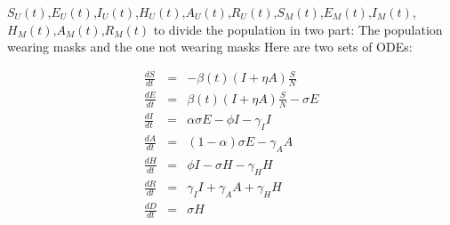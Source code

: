 \documentclass{article}
\begin{document}
$S_{U}(t)$,$E_{U}(t)$,$I_{U}(t)$,$H_{U}(t)$,$A_{U}(t)$,$R_{U}(t)$,$S_{M}(t)$,$E_{M}(t)$,$I_{M}(t)$,$H_{M}(t)$,$A_{M}(t)$,$R_{M}(t)$ to divide the population in two part: The population wearing masks and the one not wearing masks
Here are two sets of ODEs:\\
\begin{minipage}{0.45\textwidth}
\begin{eqnarray}
  \frac{dS}{dt} &=& -\beta{(t)}(I+\eta A)\frac{S}{N}\nonumber\\
  \frac{dE}{dt} &=& \beta(t)(I+\eta A)\frac{S}{N}-\sigma{E}\nonumber\\
  \frac{dI}{dt} &=& \alpha\sigma{E}-\phi{I}-\gamma_{I}I\nonumber\\
  \frac{dA}{dt} &=& (1-\alpha)\sigma E-\gamma_{A}A\nonumber\\
  \frac{dH}{dt} &=& \phi I - \sigma H - \gamma_{H}H\nonumber\\
  \frac{dR}{dt} &=& \gamma_{I}{I} + \gamma_{A}{A}+\gamma_{H}{H}\nonumber\\
  \frac{dD}{dt} &=& \sigma H\nonumber\\
\end{eqnarray}
\end{minipage}
\end{document}
